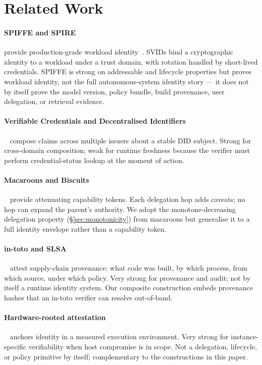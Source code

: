 \documentclass[11pt,a4paper]{article}
\begin{document}
\section{Related Work}\label{sec:related}

\paragraph{SPIFFE and SPIRE} provide production-grade workload
identity~\cite{spiffe}. SVIDs bind a cryptographic identity to a workload
under a trust domain, with rotation handled by short-lived credentials.
SPIFFE is strong on addressable and lifecycle properties but proves
workload identity, not the full autonomous-system identity story --- it
does not by itself prove the model version, policy bundle, build
provenance, user delegation, or retrieval evidence.

\paragraph{Verifiable Credentials and Decentralised
Identifiers}~\cite{w3c-vc,w3c-did} compose claims across multiple issuers
about a stable DID subject. Strong for cross-domain composition; weak for
runtime freshness because the verifier must perform credential-status
lookup at the moment of action.

\paragraph{Macaroons and Biscuits}~\cite{macaroons} provide attenuating
capability tokens. Each delegation hop adds caveats; no hop can expand the
parent's authority. We adopt the monotone-decreasing delegation property
(\S\ref{sec:monotonicity}) from macaroons but generalise it to a full
identity envelope rather than a capability token.

\paragraph{in-toto and SLSA}~\cite{in-toto,slsa} attest supply-chain
provenance: what code was built, by which process, from which source,
under which policy. Very strong for provenance and audit; not by itself
a runtime identity system. Our composite construction embeds provenance
hashes that an in-toto verifier can resolve out-of-band.

\paragraph{Hardware-rooted attestation}~\cite{tpm,sgx} anchors identity in
a measured execution environment. Very strong for instance-specific
verifiability when host compromise is in scope. Not a delegation,
lifecycle, or policy primitive by itself; complementary to the
constructions in this paper.
\end{document}
